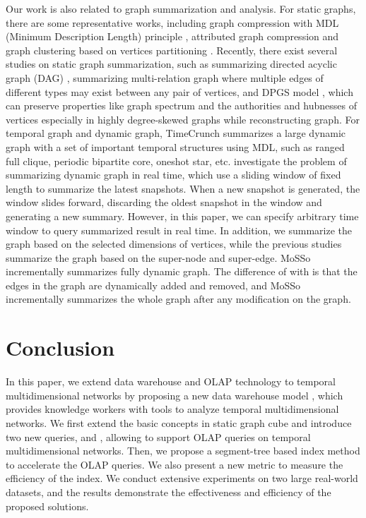 \documentclass[10pt,journal,compsoc]{IEEEtran}
\begin{document}
Our work is also related to graph summarization and analysis. For static graphs, there are some representative works, including graph compression with MDL (Minimum Description Length) principle \cite{navlakha2008graph}, attributed graph compression \cite{wu2014graph} and graph clustering based on vertices partitioning \cite{zhou2009graph}. Recently, there exist several studies on static graph summarization, such as summarizing directed acyclic graph (DAG) \cite{zhu2020top}, summarizing multi-relation graph \cite{ke2022multi} where multiple edges of different types may exist between any pair of vertices, and DPGS model \cite{zhou2021dpgs}, which can preserve properties like graph spectrum and the authorities and hubnesses of vertices especially in highly degree-skewed graphs while reconstructing graph. For temporal graph and dynamic graph, TimeCrunch \cite{shah2015timecrunch} summarizes a large dynamic graph with a set of important temporal structures using MDL, such as ranged full clique, periodic bipartite core, oneshot star, etc. \cite{fernandes2018dynamic,tsalouchidou2018scalable} investigate the problem of summarizing dynamic graph in real time, which use a sliding window of fixed length to summarize the latest snapshots. When a new snapshot is generated, the window slides forward, discarding the oldest snapshot in the window and generating a new summary. However, in this paper, we can specify arbitrary time window to query summarized result in real time. In addition, we summarize the graph based on the selected dimensions of vertices, while the previous studies summarize the graph based on the super-node and super-edge. MoSSo \cite{ko2020incremental} incrementally summarizes fully dynamic graph. The difference of \cite{ko2020incremental} with \cite{fernandes2018dynamic,tsalouchidou2018scalable} is that the edges in the graph are dynamically added and removed, and MoSSo incrementally summarizes the whole graph after any modification on the graph.

\section{Conclusion} \label{sec:conclusion}
In this paper, we extend data warehouse and OLAP technology to temporal multidimensional networks by proposing a new data warehouse model , which provides knowledge workers with tools to analyze temporal multidimensional networks. We first extend the basic concepts in static graph cube and introduce two new queries,  and , allowing  to support OLAP queries on temporal multidimensional networks. Then, we propose a segment-tree based index method to accelerate the OLAP queries. We also present a new metric to measure the efficiency of the index. We conduct extensive experiments on two large real-world datasets, and the results demonstrate the effectiveness and efficiency of the proposed solutions.
\end{document}
